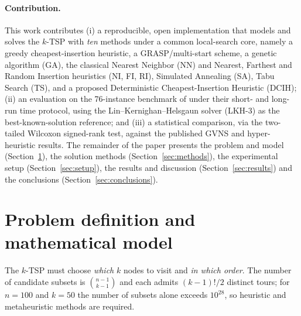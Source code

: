\documentclass[sn-chicago]{sn-jnl}
\begin{document}
\paragraph{Contribution.} This work contributes (i) a reproducible, open
implementation that models and solves the $k$-TSP with \emph{ten} methods under a
common local-search core, namely a greedy cheapest-insertion heuristic, a
GRASP/multi-start scheme, a genetic algorithm (GA), the classical Nearest Neighbor
(NN) and Nearest, Farthest and Random Insertion heuristics (NI, FI, RI), Simulated
Annealing (SA), Tabu Search (TS), and a proposed Deterministic Cheapest-Insertion
Heuristic (DCIH); (ii) an evaluation on the 76-instance benchmark of
\citet{pandiri2020} under their short- and long-run time protocol, using the
Lin--Kernighan--Helsgaun solver (LKH-3) as the best-known-solution reference; and
(iii) a statistical comparison, via the two-tailed Wilcoxon signed-rank test,
against the published GVNS and hyper-heuristic results. The remainder of the paper
presents the problem and model (Section~\ref{sec:model}), the solution methods
(Section~\ref{sec:methods}), the experimental setup (Section~\ref{sec:setup}), the
results and discussion (Section~\ref{sec:results}) and the conclusions
(Section~\ref{sec:conclusions}).

\section{Problem definition and mathematical model}\label{sec:model}

The $k$-TSP must choose \emph{which} $k$ nodes to visit and \emph{in which order}.
The number of candidate subsets is $\binom{n-1}{k-1}$ and each admits $(k-1)!/2$
distinct tours; for $n=100$ and $k=50$ the number of subsets alone exceeds
$10^{28}$, so heuristic and metaheuristic methods are required.
\end{document}
